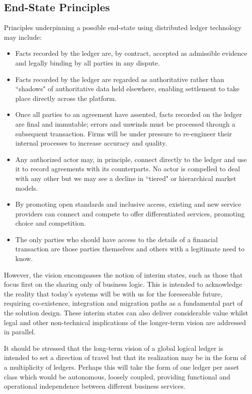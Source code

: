 \documentclass{article}
\begin{document}
\subsection{End-State Principles}
Principles underpinning a possible end-state using distributed ledger technology may include:
\begin{itemize}
	\item Facts recorded by the ledger are, by contract, accepted as admissible evidence and legally binding by all parties in any dispute.
	\item Facts recorded by the ledger are regarded as authoritative rather than ``shadows" of authoritative data held elsewhere, enabling settlement to take place directly across the platform.
	\item Once all parties to an agreement have assented, facts recorded on the ledger are final and immutable; errors and unwinds must be processed through a subsequent transaction. Firms will be under pressure to re-engineer their internal processes to increase accuracy and quality.
	\item Any authorized actor may, in principle, connect directly to the ledger and use it to record agreements with its counterparts. No actor is compelled to deal with any other but we may see a decline in ``tiered" or hierarchical market models. 
	\item By promoting open standards and inclusive access, existing and new service providers can connect and compete to offer differentiated services, promoting choice and competition.
	\item The only parties who should have access to the details of a financial transaction are those parties themselves and others with a legitimate need to know.
\end{itemize}

However, the vision encompasses the notion of interim states, such as those that focus first on the sharing only of business logic. This is intended to acknowledge the reality that today's systems will be with us for the foreseeable future, requiring co-existence, integration and migration paths as a fundamental part of the solution design. These interim states can also deliver considerable value whilst legal and other non-technical implications of the longer-term vision are addressed in parallel.

It should be stressed that the long-term vision of a global logical ledger is intended to set a direction of travel but that its realization may be in the form of a multiplicity of ledgers. Perhaps this will take the form of one ledger per asset class which would be autonomous, loosely coupled, providing functional and operational independence between different business services. 
\end{document}
